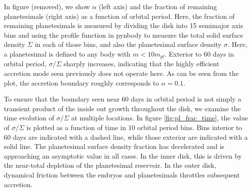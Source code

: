 \documentclass[twocolumn]{aastex63}
\begin{document}
In figure (removed), we show $\alpha$ (left axis) and the fraction of remaining planetesimals (right axis) as a function of orbital period. Here, the fraction of remaining planetesimals is measured by dividing the disk into 15 semimajor axis bins and using the profile function in {\sc pynbody} to measure the total solid surface density $\Sigma$ in each of those bins, and also the planetesimal surface density $\sigma$. Here, a planetesimal is defined to any body with $m < 10 m_{pl}$. Exterior to 60 days in orbital period, $\sigma/\Sigma$ sharply increases, indicating that the highly efficient accretion mode seen previously does not operate here. As can be seen from the plot, the accretion boundary roughly corresponds to $\alpha = 0.1$.


To ensure that the boundary seen near 60 days in orbital period is not
simply a transient product of the inside out growth throughout the
disk, we examine the time evolution of $\sigma/\Sigma$ at multiple
locations. In figure \ref{fig:pl_frac_time}, the value of
$\sigma/\Sigma$ is plotted as a function of time in 10 orbital period
bins.
Bins interior to 60 days are indicated with a dashed line, while those exterior are indicated with a solid line. The planetesimal surface density fraction has decelerated and is approaching an asymptotic value in all cases. In the inner disk, this is driven by the near-total depletion of the planetesimal reservoir. In the outer disk, dynamical friction between the embryos and planetesimals throttles subsequent accretion.


\end{document}
